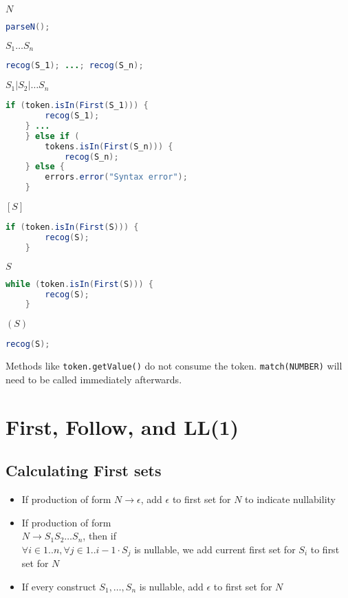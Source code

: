 \documentclass[fontsize=10pt,a4paper]{article}
\begin{document}
\begin{multicols}{3}
    $N$
    \begin{lstlisting}[language=Java]
    parseN();
    \end{lstlisting}

    $S_1 \dots S_n$
    \begin{lstlisting}[language=Java]
    recog(S_1); ...; recog(S_n);
    \end{lstlisting}

    $S_1 \vert S_2 \vert \dots S_n$
    \begin{lstlisting}[language=Java]
    if (token.isIn(First(S_1))) {
        recog(S_1);
    } ...
    } else if (
        tokens.isIn(First(S_n))) {
            recog(S_n);
    } else {
        errors.error("Syntax error");
    }
    \end{lstlisting}



    $[S]$
    \begin{lstlisting}[language=Java]
    if (token.isIn(First(S))) {
        recog(S);
    }
    \end{lstlisting}

    ${S}$
    \begin{lstlisting}[language=Java]
    while (token.isIn(First(S))) {
        recog(S);
    }
    \end{lstlisting}

    $(S)$
    \begin{lstlisting}[language=Java]
    recog(S);
    \end{lstlisting}


    Methods like \texttt{token.getValue()} do not consume the token. \texttt{match(NUMBER)} will need to be called immediately afterwards.

    \section{First, Follow, and LL(1)}


    \subsection{Calculating First sets}

    \begin{itemize}
        \item If production of form $N \rightarrow \epsilon$, add $\epsilon$ to first set for $N$ to indicate nullability
        \item If production of form \\$N \rightarrow S_1 S_2 \ldots S_n$, then if \\$\forall i \in 1..n, \forall j \in 1..i-1 \cdot S_j$ is nullable, we add current first set for $S_i$ to first set for $N$
        \item If every construct $S_1, \ldots, S_n$ is nullable, add $\epsilon$ to first set for $N$
    \end{itemize}


\end{multicols}
\end{document}
